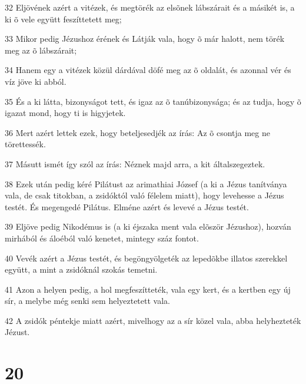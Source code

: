 \par 32 Eljövének azért a vitézek, és megtörék az elsõnek lábszárait és a másikét is, a ki õ vele együtt feszíttetett meg;
\par 33 Mikor pedig Jézushoz érének és Látják vala, hogy õ már halott, nem törék meg az õ lábszárait;
\par 34 Hanem egy a vitézek közül dárdával döfé meg az õ oldalát, és azonnal vér és víz jöve ki abból.
\par 35 És a ki látta, bizonyságot tett, és igaz az õ tanúbizonysága; és az tudja, hogy õ igazat mond, hogy ti is higyjetek.
\par 36 Mert azért lettek ezek, hogy beteljesedjék az írás: Az õ csontja meg ne törettessék.
\par 37 Másutt ismét így szól az írás: Néznek majd arra, a kit általszegeztek.
\par 38 Ezek után pedig kéré Pilátust az arimathiai József (a ki a Jézus tanítványa vala, de csak titokban, a zsidóktól való félelem miatt), hogy levehesse  a Jézus testét. És megengedé Pilátus. Elméne azért és levevé a Jézus testét.
\par 39 Eljöve pedig Nikodémus is (a ki éjszaka ment vala elõször Jézushoz), hozván mirhából és áloéból való kenetet, mintegy száz fontot.
\par 40 Vevék azért a Jézus testét, és begöngyölgeték az lepedõkbe illatos szerekkel együtt, a mint a zsidóknál szokás temetni.
\par 41 Azon a helyen pedig, a hol megfeszítteték, vala egy kert, és a kertben egy új sír, a melybe még senki sem helyeztetett vala.
\par 42 A zsidók péntekje miatt azért, mivelhogy az a sír közel vala, abba helyhezteték Jézust.

\chapter{20}


